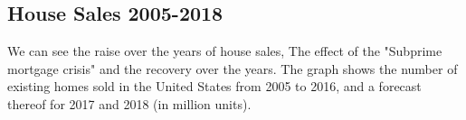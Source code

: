 \documentclass{scrartcl}
\begin{document}
\newpage
\begin{appendices}
\section{House Sales 2005-2018\cite{statista}}
\label{appendix:House sales}
We can see the raise over the years of house sales, The effect of the "Subprime mortgage crisis" and the recovery over the years. The graph shows the number of existing homes sold in the United States from 2005 to 2016, and a forecast thereof for 2017 and 2018 (in million units).
\begin{figure}[H]
\centering
{}
\end{figure}


\end{appendices}
\end{document}
